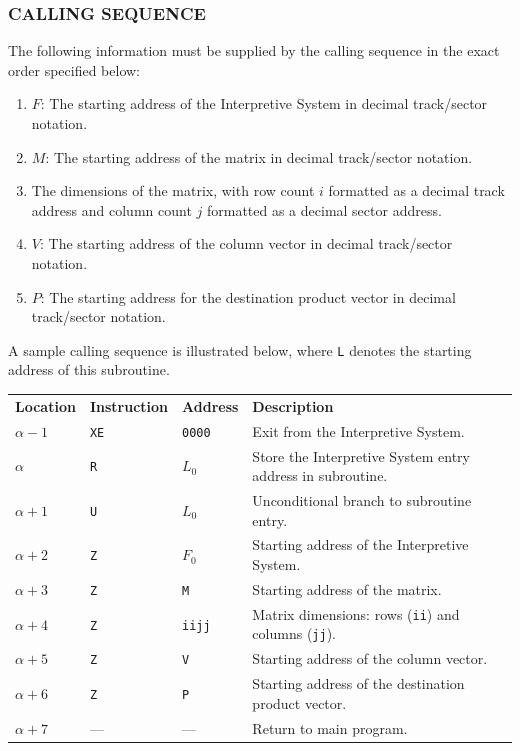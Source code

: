 \documentclass{article}
\begin{document}
\subsubsection*{CALLING SEQUENCE}
The following information must be supplied by the calling sequence in the exact order specified below:
\begin{enumerate}[label=\arabic*., leftmargin=1.5em, itemsep=2pt]
    \item $F$: The starting address of the Interpretive System in decimal track/sector notation.
    \item $M$: The starting address of the matrix in decimal track/sector notation.
    \item The dimensions of the matrix, with row count $i$ formatted as a decimal track address and column count $j$ formatted as a decimal sector address.
    \item $V$: The starting address of the column vector in decimal track/sector notation.
    \item $P$: The starting address for the destination product vector in decimal track/sector notation.
\end{enumerate}
\noindent
A sample calling sequence is illustrated below, where \texttt{L} denotes the starting address of this subroutine.

\medskip
\noindent
\begin{center}
\begin{tabular}{llll}
\textbf{Location} & \textbf{Instruction} & \textbf{Address} & \textbf{Description} \\
$\alpha - 1$      & \texttt{XE}           & \texttt{0000}    & Exit from the Interpretive System. \\
$\alpha$          & \texttt{R}            & \texttt{$L_0$}   & Store the Interpretive System entry address in subroutine. \\
$\alpha + 1$      & \texttt{U}            & \texttt{$L_0$}       & Unconditional branch to subroutine entry. \\
$\alpha + 2$      & \texttt{Z}            & \texttt{$F_0$}       & Starting address of the Interpretive System. \\
$\alpha + 3$      & \texttt{Z}            & \texttt{M}       & Starting address of the matrix. \\
$\alpha + 4$      & \texttt{Z}            & \texttt{iijj}    & Matrix dimensions: rows (\texttt{ii}) and columns (\texttt{jj}). \\
$\alpha + 5$      & \texttt{Z}            & \texttt{V}       & Starting address of the column vector. \\
$\alpha + 6$      & \texttt{Z}            & \texttt{P}       & Starting address of the destination product vector. \\
$\alpha + 7$      & ---                   & ---              & Return to main program.
\end{tabular}
\end{center}
\end{document}
